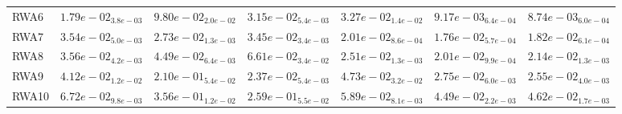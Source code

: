 \documentclass{article}
\begin{document}
\begin{table}
\begin{scriptsize}
\begin{tabular}{lllllll}
RWA6 & $  1.79e-02_{ 3.8e-03}$ & $  9.80e-02_{ 2.0e-02}$ & $  3.15e-02_{ 5.4e-03}$ & $  3.27e-02_{ 1.4e-02}$ & \cellcolor{gray25}$  9.17e-03_{ 6.4e-04}$ & \cellcolor{gray95}$  8.74e-03_{ 6.0e-04}$ \\
RWA7 & $  3.54e-02_{ 5.0e-03}$ & $  2.73e-02_{ 1.3e-03}$ & $  3.45e-02_{ 3.4e-03}$ & $  2.01e-02_{ 8.6e-04}$ & \cellcolor{gray95}$  1.76e-02_{ 5.7e-04}$ & \cellcolor{gray25}$  1.82e-02_{ 6.1e-04}$ \\
RWA8 & $  3.56e-02_{ 4.2e-03}$ & $  4.49e-02_{ 6.4e-03}$ & $  6.61e-02_{ 3.4e-02}$ & $  2.51e-02_{ 1.3e-03}$ & \cellcolor{gray95}$  2.01e-02_{ 9.9e-04}$ & \cellcolor{gray25}$  2.14e-02_{ 1.3e-03}$ \\
RWA9 & $  4.12e-02_{ 1.2e-02}$ & $  2.10e-01_{ 5.4e-02}$ & \cellcolor{gray95}$  2.37e-02_{ 5.4e-03}$ & $  4.73e-02_{ 3.2e-02}$ & $  2.75e-02_{ 6.0e-03}$ & \cellcolor{gray25}$  2.55e-02_{ 4.0e-03}$ \\
RWA10 & $  6.72e-02_{ 9.8e-03}$ & $  3.56e-01_{ 1.2e-02}$ & $  2.59e-01_{ 5.5e-02}$ & $  5.89e-02_{ 8.1e-03}$ & \cellcolor{gray95}$  4.49e-02_{ 2.2e-03}$ & \cellcolor{gray25}$  4.62e-02_{ 1.7e-03}$ \\
\hline
\end{tabular}
\end{scriptsize}
\end{table}
\end{document}
